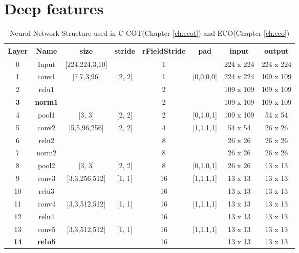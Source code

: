 \documentclass[12pt]{article}
\numberwithin{equation}{section}
\begin{document}
\section{Deep features \cite{chatfield2014return}}
	\begin{table}[h!] 
  		\centering
  		\begin{tabular}{c|c|c|c|c|c|c|c}
   			Layer & Name & size & stride&rFieldStride& pad        & input         & output\\
   			\hline
			0        & Input   &[224,224,3,10]&           &1&              & 224 x 224 & 224 x 224\\ 
			1        & conv1 & [7,7,3,96]       &[2, 2]   &1& [0,0,0,0] & 224 x 224 & 109 x 109\\ 
			2        & relu1   &                       &            &2&               & 109 x 109 & 109 x 109\\ 
	     \textbf{3}  & \textbf{norm1} &                       &           &2&                & 109 x 109 & 109 x 109\\ 
			4        & pool1  & [3, 3]              & [2, 2]   &2& [0,1,0,1]  & 109 x 109  & 54 x 54\\ 
			5        & conv2 & [5,5,96,256]   & [2, 2]   &4&[1,1,1,1]   &  54 x 54    & 26 x 26 \\ 
			6        & relu2   &                       &            &8&                &  26 x 26 &  26 x 26\\ 
			7        & norm2 &                       &            &8&                &  26 x 26 &  26 x 26\\ 
			8        & pool2  & [3, 3]              & [2, 2]   &8& [0,1,0,1]  &  26 x 26 & 13 x 13\\ 
			9        & conv3 & [3,3,256,512] & [1, 1]   &16&[1,1,1,1]   & 13 x 13 & 13 x 13\\ 
			10      & relu3   &                       &            &16&                & 13 x 13 & 13 x 13\\
			11      & conv4 & [3,3,512,512]  & [1, 1]  &16&[1,1,1,1]   & 13 x 13 & 13 x 13\\ 
			12      & relu4   &             		&          &16&                 & 13 x 13 & 13 x 13\\ 
			13      & conv5 & [3,3,512,512]  & [1, 1] &16&[1,1,1,1]    & 13 x 13 & 13 x 13\\ 
	     \textbf{14} & \textbf{relu5}   &                        &          &16&                 & 13 x 13 & 13 x 13\\  
  		\end{tabular}
		\caption{Neural Network Structure used in C-COT(Chapter \ref{ch:ccot}) and ECO(Chapter \ref{ch:eco})}
		\label{tab:deep}
	\end{table} \par
\end{document}
